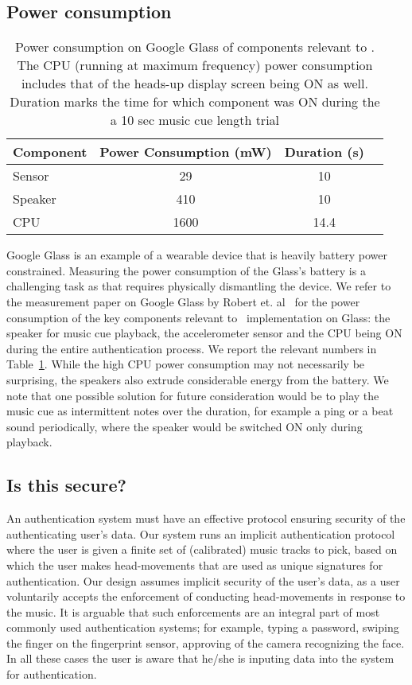 \subsection{Power consumption}

\begin{table}
\centering
\begin{tabular}{lccc}
\hline
Component    & Power Consumption (mW) & Duration (s)       \\ \hline\hline
Sensor  & 29                    & 10       \\
Speaker & 410                    & 10      \\
CPU      & 1600                   & 14.4 \\ \hline
\end{tabular}
\caption{Power consumption on Google Glass of components relevant to 
\systemname.  The CPU (running at 
maximum frequency) power consumption includes that of the heads-up display 
screen being ON as well. Duration marks the time for which
component was ON during the a 10 sec music cue length trial}
\label{tab:pow}
\end{table}

Google Glass is an example of a wearable device that is heavily battery power 
constrained. Measuring the power consumption of the Glass's battery is a 
challenging task as that requires physically dismantling the device. 
We refer to the measurement paper on Google Glass by Robert et. 
al~\cite{likamwa2014draining} for the power consumption of the 
key components relevant to \systemname~implementation on Glass: the speaker 
for music cue playback, the accelerometer sensor and the CPU being ON during 
the entire authentication process. We report the relevant numbers in 
Table~\ref{tab:pow}. While the high CPU power consumption may not necessarily 
be surprising, the speakers also extrude considerable energy from the battery. 
We note that one possible solution for future consideration would be to play 
the music cue as intermittent notes over the duration, for example a ping or a 
beat sound periodically, where the speaker would be switched ON only during 
playback.

\subsection{Is this secure?}
An authentication system must have an effective protocol ensuring security of 
the authenticating user's data. Our system runs an implicit
authentication protocol where the user is given a finite set of (calibrated) 
music tracks to pick, based on which the user makes head-movements that are 
used as unique signatures for authentication.
Our design assumes implicit security of the user's data, as a
user voluntarily accepts the enforcement of conducting head-movements  
in response to the music. It is arguable that such enforcements are an 
integral part of most commonly used authentication systems; for example, 
typing a password, swiping the finger on the fingerprint sensor, approving of 
the camera recognizing the face. In all these cases the user is aware 
that he/she is inputing data into the system for authentication.

